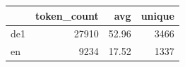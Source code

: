 \begin{tabular}{lrrr}
\toprule
 & token_count & avg & unique \\
\midrule
de1 & 27910 & 52.96 & 3466 \\
en & 9234 & 17.52 & 1337 \\
\bottomrule
\end{tabular}
